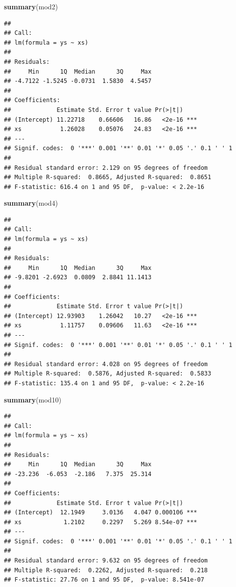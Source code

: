 \documentclass[
]{book}
\newenvironment{Shaded}{\begin{snugshade}}{\end{snugshade}}
\newcommand{\KeywordTok}[1]{\textcolor[rgb]{0.13,0.29,0.53}{\textbf{#1}}}
\newcommand{\NormalTok}[1]{#1}
\begin{document}
\begin{Shaded}
\begin{Highlighting}[]
\KeywordTok{summary}\NormalTok{(mod2)}
\end{Highlighting}
\end{Shaded}

\begin{verbatim}
## 
## Call:
## lm(formula = ys ~ xs)
## 
## Residuals:
##     Min      1Q  Median      3Q     Max 
## -4.7122 -1.5245 -0.0731  1.5830  4.5457 
## 
## Coefficients:
##             Estimate Std. Error t value Pr(>|t|)    
## (Intercept) 11.22718    0.66606   16.86   <2e-16 ***
## xs           1.26028    0.05076   24.83   <2e-16 ***
## ---
## Signif. codes:  0 '***' 0.001 '**' 0.01 '*' 0.05 '.' 0.1 ' ' 1
## 
## Residual standard error: 2.129 on 95 degrees of freedom
## Multiple R-squared:  0.8665,	Adjusted R-squared:  0.8651 
## F-statistic: 616.4 on 1 and 95 DF,  p-value: < 2.2e-16
\end{verbatim}

\begin{Shaded}
\begin{Highlighting}[]
\KeywordTok{summary}\NormalTok{(mod4)}
\end{Highlighting}
\end{Shaded}

\begin{verbatim}
## 
## Call:
## lm(formula = ys ~ xs)
## 
## Residuals:
##     Min      1Q  Median      3Q     Max 
## -9.8201 -2.6923  0.0809  2.8841 11.1413 
## 
## Coefficients:
##             Estimate Std. Error t value Pr(>|t|)    
## (Intercept) 12.93903    1.26042   10.27   <2e-16 ***
## xs           1.11757    0.09606   11.63   <2e-16 ***
## ---
## Signif. codes:  0 '***' 0.001 '**' 0.01 '*' 0.05 '.' 0.1 ' ' 1
## 
## Residual standard error: 4.028 on 95 degrees of freedom
## Multiple R-squared:  0.5876,	Adjusted R-squared:  0.5833 
## F-statistic: 135.4 on 1 and 95 DF,  p-value: < 2.2e-16
\end{verbatim}

\begin{Shaded}
\begin{Highlighting}[]
\KeywordTok{summary}\NormalTok{(mod10)}
\end{Highlighting}
\end{Shaded}

\begin{verbatim}
## 
## Call:
## lm(formula = ys ~ xs)
## 
## Residuals:
##     Min      1Q  Median      3Q     Max 
## -23.236  -6.053  -2.186   7.375  25.314 
## 
## Coefficients:
##             Estimate Std. Error t value Pr(>|t|)    
## (Intercept)  12.1949     3.0136   4.047 0.000106 ***
## xs            1.2102     0.2297   5.269 8.54e-07 ***
## ---
## Signif. codes:  0 '***' 0.001 '**' 0.01 '*' 0.05 '.' 0.1 ' ' 1
## 
## Residual standard error: 9.632 on 95 degrees of freedom
## Multiple R-squared:  0.2262,	Adjusted R-squared:  0.218 
## F-statistic: 27.76 on 1 and 95 DF,  p-value: 8.541e-07
\end{verbatim}
\end{document}

